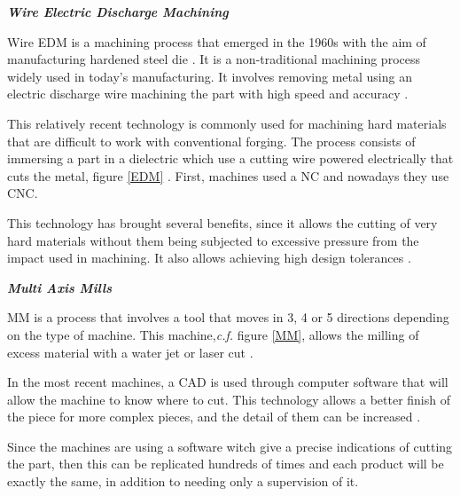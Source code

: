 \textbf{\emph{Wire Electric Discharge Machining}}\par 
\vspace{5}\par
Wire \ac{EDM} is a machining process that emerged in the 1960s with the aim of manufacturing hardened steel die \cite{el2018fundamentals}. It is a non-traditional machining process widely used in today's manufacturing. It involves removing metal using an electric discharge wire machining the part with high speed and accuracy \cite{tominaga1987electrode,rajurkar2013review}.\par 
This relatively recent technology is commonly used for machining hard materials that are difficult to work with conventional forging. The process consists of immersing a part in a dielectric which use a cutting wire powered electrically that cuts the metal,  figure \ref{EDM} \cite{rajurkar2013review}. First, machines used a \ac{NC} and nowadays they use \ac{CNC}. \par
This technology has brought several benefits, since it allows the cutting of very hard materials without them being subjected to excessive pressure from the impact used in machining. It also allows achieving high design tolerances \cite{el2018fundamentals}.\par

\vspace{10}

\textbf{\emph{Multi Axis Mills}}
\vspace{5}\par
\ac{MM} is a process that involves a tool that moves in 3, 4 or 5 directions depending on the type of machine. This machine,\textit{c.f.} figure \ref{MM}, allows the milling of excess material with a water jet or laser cut \cite{el2018fundamentals}.\par
In the most recent machines, a CAD is used through computer software that will allow the machine to know where to cut. This technology allows a better finish of the piece for more complex pieces, and the detail of them can be increased \cite{son2009hybrid}.\par
Since the machines are using a software witch give a precise indications of cutting the part, then this can be replicated hundreds of times and each product will be exactly the same, in addition to needing only a supervision of it.\par
\vspace{5}


